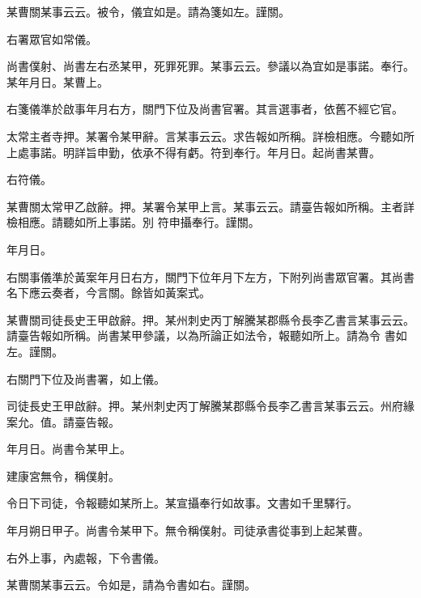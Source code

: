 \begin{pinyinscope}
 某曹關某事云云。被令，儀宜如是。請為箋如左。謹關。



 右署眾官如常儀。



 尚書僕射、尚書左右丞某甲，死罪死罪。某事云云。參議以為宜如是事諾。奉行。某年月日。某曹上。



 右箋儀準於啟事年月右方，關門下位及尚書官署。其言選事者，依舊不經它官。



 太常主者寺押。某署令某甲辭。言某事云云。求告報如所稱。詳檢相應。今聽如所上處事諾。明詳旨申勤，依承不得有虧。符到奉行。年月日。起尚書某曹。



 右符儀。



 某曹關太常甲乙啟辭。押。某署令某甲上言。某事云云。請臺告報如所稱。主者詳檢相應。請聽如所上事諾。別
 符申攝奉行。謹關。



 年月日。



 右關事儀準於黃案年月日右方，關門下位年月下左方，下附列尚書眾官署。其尚書名下應云奏者，今言關。餘皆如黃案式。



 某曹關司徒長史王甲啟辭。押。某州刺史丙丁解騰某郡縣令長李乙書言某事云云。請臺告報如所稱。尚書某甲參議，以為所論正如法令，報聽如所上。請為令
 書如左。謹關。



 右關門下位及尚書署，如上儀。



 司徒長史王甲啟辭。押。某州刺史丙丁解騰某郡縣令長李乙書言某事云云。州府緣案允。值。請臺告報。



 年月日。尚書令某甲上。



 建康宮無令，稱僕射。



 令日下司徒，令報聽如某所上。某宣攝奉行如故事。文書如千里驛行。



 年月朔日甲子。尚書令某甲下。無令稱僕射。司徒承書從事到上起某曹。



 右外上事，內處報，下令書儀。



 某曹關某事云云。令如是，請為令書如右。謹關。




\end{pinyinscope}
